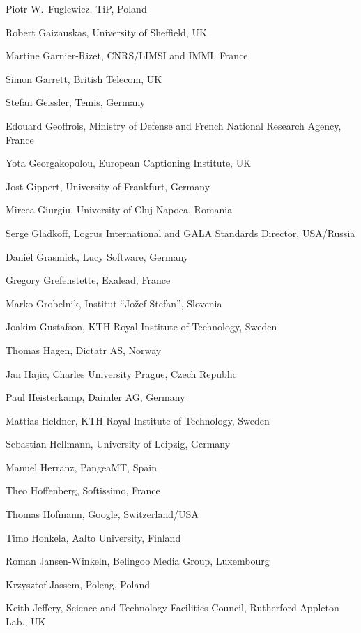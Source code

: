\documentclass[10pt, plain]{../../metanetpaper}
\begin{document}
\begin{multicols}{3}
\begin{small}
\begin{enumerate}
{      \item Piotr W.~Fuglewicz, TiP, Poland
      \item Robert Gaizauskas, University of Sheffield, UK
      \item Martine Garnier-Rizet, CNRS/LIMSI and IMMI, France
      \item Simon Garrett, British Telecom, UK
      \item Stefan Geissler, Temis, Germany
      \item Edouard Geoffrois, Ministry of Defense and French National Research Agency, France
      \item Yota Georgakopolou, European Captioning Institute, UK
      \item Jost Gippert, University of Frankfurt, Germany
      \item Mircea Giurgiu, University of Cluj-Napoca, Romania
      \item Serge Gladkoff, Logrus International and GALA Standards Director, USA/Russia
      \item Daniel Grasmick, Lucy Software, Germany
      \item Gregory Grefenstette, Exalead, France
      \item Marko Grobelnik, Institut ``Jožef Stefan'', Slovenia
      \item Joakim Gustafson, KTH Royal Institute of Technology, Sweden
      \item Thomas Hagen, Dictatr AS, Norway
      \item Jan Hajic, Charles University Prague, Czech Republic
      \item Paul Heisterkamp, Daimler AG, Germany
      \item Mattias Heldner, KTH Royal Institute of Technology, Sweden
      \item Sebastian Hellmann, University of Leipzig, Germany
      \item Manuel Herranz, PangeaMT, Spain
      \item Theo Hoffenberg, Softissimo, France
      \item Thomas Hofmann, Google, Switzerland/USA
      \item Timo Honkela, Aalto University, Finland
      \item Roman Jansen-Winkeln, Belingoo Media Group, Luxembourg
      \item Krzysztof Jassem, Poleng, Poland
      \item Keith Jeffery, Science and Technology Facilities Council, Rutherford Appleton Lab., UK
}
\end{enumerate}
\end{small}
\end{multicols}
\end{document}
